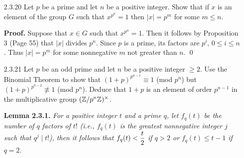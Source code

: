 \begin{enumerate}
      \textbf{Proof.} Let $H$ be a group and let $h \in H$. First we shall show
      that there exists a homomorphism from $\Z$ to $H$ such that $1 \mapsto h$.
      So consider the map $\alpha : \Z \rightarrow H$ defined by
      $n \mapsto h^n$. Clearly $\alpha(1) = h$ and
      $$\alpha(x+y) = h^{x+y} = h^xh^y = \alpha(x)\alpha(y) \text{ for all }
        x, y \in \Z^+,$$
      so that $\alpha$ is a homomorphism. To show uniqueness, suppose that
      $\alpha' : \Z \rightarrow H$ is an homomorphism such that
      $\alpha'(1) = h$. Then according to Exercise 1.6.1, we have that
      $\alpha'(n) = \alpha'(n\cdot1) = \alpha'(1)^n = h^n$ for all $n \in \Z$;
      that is, $\alpha' = \alpha$, as desired. \qed
   \item[2.3.20]  Let $p$ be a prime and let $n$ be a positive integer. Show
                  that if $x$ is an element of the group $G$ such that
                  $x^{p^n} = 1$ then $|x| = p^m$ for some $m \le n$.
                  
      \textbf{Proof.} Suppose that $x \in G$ such that $x^{p^n} = 1$. Then it
      follows by Proposition 3 (Page 55) that $|x|$ divides $p^n$. Since $p$ is
      a prime, its factors are $p^i$, $0 \le i \le n$. Thus $|x| = p^m$ for
      some nonnegative $m$ not greater than $n$. \qed
   \item[2.3.21]  Let $p$ be an odd prime and let $n$ be a positive integer
                  $\ge 2$. Use the Binomial Theorem to show that
                  $(1+p)^{p^{n-1}} \equiv 1$ (mod $p^n$) but
                  $(1+p)^{p^{n-2}} \not\equiv 1$ (mod $p^n$). Deduce that $1+p$
                  is an element of order $p^{n-1}$ in the multiplicative group
                  $(\mathbb{Z}/p^n\mathbb{Z})^\times$.

      \textbf{Lemma 2.3.1.} \textit{For a positive integer $t$ and a prime $q$, 
      let $f_q(t)$ be the number of $q$ factors of $t!$ (i.e., $f_q(t)$ is
      the greatest nonnegative integer $j$ such that $q^j \mid t!$), then it 
      follows that $f_q(t) < \displaystyle\frac{t}{2}$ if $q > 2$ or $f_q(t) \le t - 1$ if
      $q = 2$}.


\end{enumerate}
